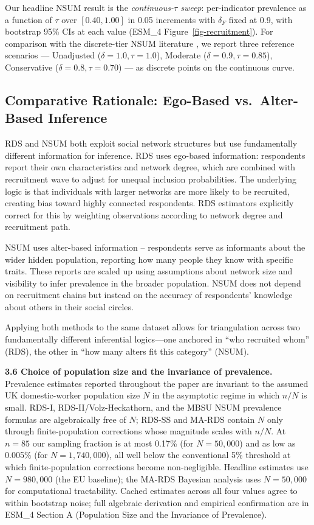 \documentclass[
  12pt,
  letterpaper,
  DIV=11,
  numbers=noendperiod]{scrartcl}
\begin{document}
Our headline NSUM result is the \emph{continuous-\(\tau\) sweep}:
per-indicator prevalence as a function of \(\tau\) over \([0.40, 1.00]\)
in 0.05 increments with \(\delta_F\) fixed at 0.9, with bootstrap 95\%
CIs at each value (ESM\_4 Figure~\ref{fig-recruitment}). For comparison
with the discrete-tier NSUM literature
\autocite{kill98-social,malt15-estimating,feeh16-generalizing}, we
report three reference scenarios --- Unadjusted
(\(\delta = 1.0, \tau = 1.0\)), Moderate
(\(\delta = 0.9, \tau = 0.85\)), Conservative
(\(\delta = 0.8, \tau = 0.70\)) --- as discrete points on the continuous
curve.

\subsection{Comparative Rationale: Ego-Based vs.~Alter-Based
Inference}\label{sec-comparative-rationale}

RDS and NSUM both exploit social network structures but use
fundamentally different information for inference. RDS uses ego-based
information: respondents report their own characteristics and network
degree, which are combined with recruitment wave to adjust for unequal
inclusion probabilities. The underlying logic is that individuals with
larger networks are more likely to be recruited, creating bias toward
highly connected respondents. RDS estimators explicitly correct for this
by weighting observations according to network degree and recruitment
path.

NSUM uses alter-based information -- respondents serve as informants
about the wider hidden population, reporting how many people they know
with specific traits. These reports are scaled up using assumptions
about network size and visibility to infer prevalence in the broader
population. NSUM does not depend on recruitment chains but instead on
the accuracy of respondents' knowledge about others in their social
circles.

Applying both methods to the same dataset allows for triangulation
across two fundamentally different inferential logics---one anchored in
``who recruited whom'' (RDS), the other in ``how many alters fit this
category'' (NSUM).

\textbf{3.6 Choice of population size and the invariance of prevalence.}
Prevalence estimates reported throughout the paper are invariant to the
assumed UK domestic-worker population size \(N\) in the asymptotic
regime in which \(n/N\) is small. RDS-I, RDS-II/Volz-Heckathorn, and the
MBSU NSUM prevalence formulas are algebraically free of \(N\); RDS-SS
and MA-RDS contain \(N\) only through finite-population corrections
whose magnitude scales with \(n/N\). At \(n = 85\) our sampling fraction
is at most 0.17\% (for \(N = 50{,}000\)) and as low as 0.005\% (for
\(N = 1{,}740{,}000\)), all well below the conventional 5\% threshold at
which finite-population corrections become non-negligible. Headline
estimates use \(N = 980{,}000\) (the EU baseline); the MA-RDS Bayesian
analysis uses \(N = 50{,}000\) for computational tractability. Cached
estimates across all four values agree to within bootstrap noise; full
algebraic derivation and empirical confirmation are in ESM\_4 Section A
(Population Size and the Invariance of Prevalence).
\end{document}
